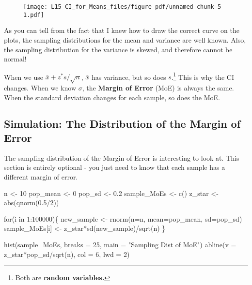 \documentclass[
  letterpaper,
  DIV=11,
  numbers=noendperiod]{scrreprt}
\newenvironment{Shaded}{\begin{snugshade}}{\end{snugshade}}
\newcommand{\AttributeTok}[1]{\textcolor[rgb]{0.40,0.45,0.13}{#1}}
\newcommand{\ControlFlowTok}[1]{\textcolor[rgb]{0.00,0.23,0.31}{#1}}
\newcommand{\DecValTok}[1]{\textcolor[rgb]{0.68,0.00,0.00}{#1}}
\newcommand{\FloatTok}[1]{\textcolor[rgb]{0.68,0.00,0.00}{#1}}
\newcommand{\FunctionTok}[1]{\textcolor[rgb]{0.28,0.35,0.67}{#1}}
\newcommand{\NormalTok}[1]{\textcolor[rgb]{0.00,0.23,0.31}{#1}}
\newcommand{\OtherTok}[1]{\textcolor[rgb]{0.00,0.23,0.31}{#1}}
\newcommand{\SpecialCharTok}[1]{\textcolor[rgb]{0.37,0.37,0.37}{#1}}
\newcommand{\StringTok}[1]{\textcolor[rgb]{0.13,0.47,0.30}{#1}}
\begin{document}
\begin{figure}[H]

{\centering \texttt{[image: L15-CI\_for\_Means\_files/figure-pdf/unnamed-chunk-5-1.pdf]}

}

\end{figure}

As you can tell from the fact that I knew how to draw the correct curve
on the plots, the sampling distributions for the mean and variance are
well known. Also, the sampling distribution for the variance is skewed,
and therefore cannot be normal!

When we use \(\bar x+ z^*s/\sqrt{n}\), \(\bar x\) has variance, but so
does \(s\).\footnote{Both are \textbf{random variables.}} This is why
the CI changes. When we know \(\sigma\), the \textbf{Margin of Error}
(MoE) is always the same. When the standard deviation changes for each
sample, so does the MoE.

\hypertarget{simulation-the-distribution-of-the-margin-of-error}{%
\subsection{Simulation: The Distribution of the Margin of
Error}\label{simulation-the-distribution-of-the-margin-of-error}}

The sampling distribution of the Margin of Error is interesting to look
at. This section is entirely optional - you just need to know that each
sample has a different margin of error.

\begin{Shaded}
\begin{Highlighting}[]
\NormalTok{n }\OtherTok{\textless{}{-}} \DecValTok{10}
\NormalTok{pop\_mean }\OtherTok{\textless{}{-}} \DecValTok{0}
\NormalTok{pop\_sd }\OtherTok{\textless{}{-}} \FloatTok{0.2}
\NormalTok{sample\_MoEs }\OtherTok{\textless{}{-}} \FunctionTok{c}\NormalTok{()}
\NormalTok{z\_star }\OtherTok{\textless{}{-}} \FunctionTok{abs}\NormalTok{(}\FunctionTok{qnorm}\NormalTok{(}\FloatTok{0.5}\SpecialCharTok{/}\DecValTok{2}\NormalTok{))}

\ControlFlowTok{for}\NormalTok{(i }\ControlFlowTok{in} \DecValTok{1}\SpecialCharTok{:}\DecValTok{100000}\NormalTok{)\{}
\NormalTok{    new\_sample }\OtherTok{\textless{}{-}} \FunctionTok{rnorm}\NormalTok{(}\AttributeTok{n=}\NormalTok{n, }\AttributeTok{mean=}\NormalTok{pop\_mean, }\AttributeTok{sd=}\NormalTok{pop\_sd)}
\NormalTok{    sample\_MoEs[i] }\OtherTok{\textless{}{-}}\NormalTok{ z\_star}\SpecialCharTok{*}\FunctionTok{sd}\NormalTok{(new\_sample)}\SpecialCharTok{/}\FunctionTok{sqrt}\NormalTok{(n)}
\NormalTok{\}}

\FunctionTok{hist}\NormalTok{(sample\_MoEs, }\AttributeTok{breaks =} \DecValTok{25}\NormalTok{,}
    \AttributeTok{main =} \StringTok{"Sampling Dist of MoE"}\NormalTok{)}
\FunctionTok{abline}\NormalTok{(}\AttributeTok{v =}\NormalTok{ z\_star}\SpecialCharTok{*}\NormalTok{pop\_sd}\SpecialCharTok{/}\FunctionTok{sqrt}\NormalTok{(n), }\AttributeTok{col =} \DecValTok{6}\NormalTok{, }\AttributeTok{lwd =} \DecValTok{2}\NormalTok{)}
\end{Highlighting}
\end{Shaded}
\end{document}
